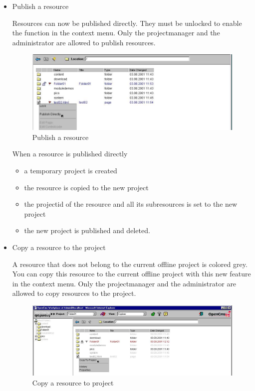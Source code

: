\begin{itemize}
\item Publish a resource 

Resources can now be published directly. They must be unlocked to
enable the function in the context menu. Only the projectmanager
and the administrator are allowed to publish resources.

\begin{figure}[hbt]
\begin{center}
\includegraphics[width=\sgw]
                   {pics/newProject/publish03}
\caption[Publish a resource]
           {Publish a resource}
\label{publishres}
\end{center}
\end{figure}

When a resource is published directly

\begin{itemize}
\item a temporary project is created
\item the resource is copied to the new project
\item the projectid of the resource and all its subresources is set to the new project
\item the new project is published and deleted.
\end{itemize}


\item Copy a resource to the project

A resource that does not belong to the current offline project is
colored grey. You can copy this resource to the current offline
project with this new feature in the context menu. Only the
projectmanager and the administrator are allowed to copy resources
to the project.

\begin{figure}[hbt]
\begin{center}
\includegraphics[width=\sgw]
                   {pics/newProject/copyPro02}
\caption[Copy a resource to project]
           {Copy a resource to project}
\label{copytoproject}
\end{center}
\end{figure}


\end{itemize}
